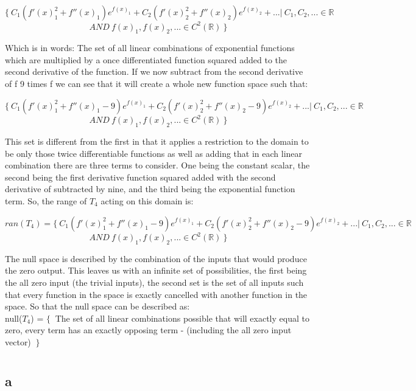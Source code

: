 \documentclass[12pt]{article}
\begin{document}
$$\{\ C_1 (f'(x)^{2}_{1} + f''(x)_{1} )e^{f(x)_1} + C_2 ( f'(x)^{2}_{2} + f''(x)_{2} )e^{f(x)_2} + ... |\ C_1 , C_2 , ... \in \mathbb{R}\ $$
$$ AND\ f(x)_1 , f(x)_2 , ... \in C^{2}(\mathbb{R})  \ \} $$

Which is in words: The set of all linear combinations of exponential functions which are multiplied by a once differentiated function squared added to the second derivative of the function. If we now subtract from the second derivative of f 9 times f we can see that it will create a whole new function space such that:

$$\{\ C_1 (f'(x)^{2}_{1} + f''(x)_{1} - 9)e^{f(x)_1} + C_2 ( f'(x)^{2}_{2} + f''(x)_{2} - 9 )e^{f(x)_2} + ... |\ C_1 , C_2 , ... \in \mathbb{R}\ $$
$$AND\ f(x)_1 , f(x)_2 , ... \in C^{2}(\mathbb{R})  \ \} $$

This set is different from the first in that it applies a restriction to the domain to be only those twice differentiable functions as well as adding that in each linear combination there are three terms to consider. One being the constant scalar, the second being the first derivative function squared added with the second derivative of subtracted by nine, and the third being the exponential function term. So, the range of $T_4$ acting on this domain is:

$$ ran(T_4) = \{\ C_1 (f'(x)^{2}_{1} + f''(x)_{1} - 9)e^{f(x)_1} + C_2 ( f'(x)^{2}_{2} + f''(x)_{2} - 9 )e^{f(x)_2} + ... |\ C_1 , C_2 , ... \in \mathbb{R}\ $$
$$AND\ f(x)_1 , f(x)_2 , ... \in C^{2}(\mathbb{R})  \ \}$$

The null space is described by the combination of the inputs that would produce the zero output. This leaves us with an infinite set of possibilities, the first being the all zero input (the trivial inputs), the second set is the set of all inputs such that every function in the space is exactly cancelled with another function in the space. So that the null space can be described as:\\

null($T_{4}$) = $\{\ $ The set of all linear combinations possible that will exactly equal to zero, every term has an exactly opposing term - (including the all zero input vector) $\ \}$ 


\section{}

\subsection*{a}
\end{document}
